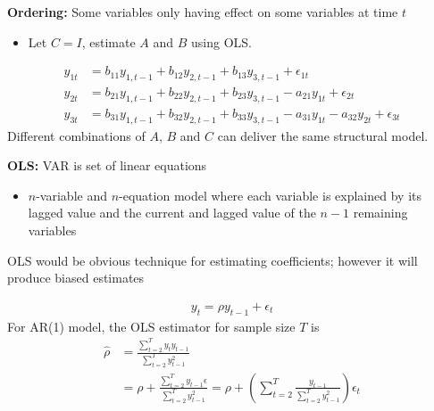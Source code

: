 \documentclass{beamer}
\begin{document}
\begin{frame}
  \textbf{Ordering:} Some variables only having effect on some variables at time $t$
  \begin{itemize}
    \item Let $C=I$, estimate $A$ and $B$ using OLS.
  \end{itemize}
   
\begin{align}
  y_{1t} &= b_{11}y_{1,t-1} + b_{12}y_{2,t-1} + b_{13}y_{3,t-1} + \epsilon_{1t}\\ \nonumber
  y_{2t} &= b_{21}y_{1,t-1} + b_{22}y_{2,t-1} + b_{23}y_{3,t-1}-a_{21}y_{1t} + \epsilon_{2t}\\ \nonumber
  y_{3t} &= b_{31}y_{1,t-1} + b_{32}y_{2,t-1} + b_{33}y_{3,t-1}-a_{31}y_{1t} - a_{32}y_{2t} + \epsilon_{3t}
\end{align}
  \medskip 
  Different combinations of $A$, $B$ and $C$ can deliver the same structural model. 
\end{frame}

\begin{frame}
  \textbf{OLS:} VAR is set of linear equations
  \begin{itemize}
    \item $n$-variable and $n$-equation model where each variable is explained by its lagged value and the current and lagged value of the $n-1$ remaining variables
  \end{itemize}
  \medskip
  OLS would be obvious technique for estimating coefficients; however it will produce biased estimates
\end{frame}

\begin{frame}  
\begin{align}
  y_t= \rho y_{t-1} + \epsilon_t
\end{align}
 For AR(1) model, the OLS estimator for sample size $T$ is
\begin{align}
  \hat{\rho} &= \frac{\sum^T_{t=2}y_t y_{t-1}}{\sum^T_{t=2}y^2_{t-1}}\\ \nonumber
  &= \rho + \frac{\sum^T_{t=2} y_{t-1} \epsilon}{\sum^T_{t=2}y^2_{t-1}}=
  \rho +   \left(\sum_{t=2}^T \frac{y_{t-1}}{\sum_{t=2}^T y^2_{t-1}} \right) \epsilon_t
\end{align}
\end{frame}
\end{document}
